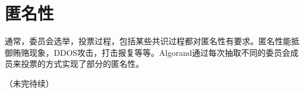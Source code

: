 \section{匿名性}
通常，委员会选举，投票过程，包括某些共识过程都对匿名性有要求。匿名性能抵御贿赂现象，DDOS攻击，打击报复等等。Algorand通过每次抽取不同的委员会成员来投票的方式实现了部分的匿名性。

（未完待续）